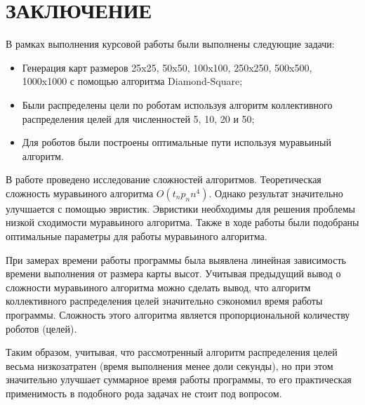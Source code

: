 \documentclass{article}
\numberwithin{equation}{section}
\begin{document}
    \newpage
	\section*{ЗАКЛЮЧЕНИЕ}

	В рамках выполнения курсовой работы были выполнены следующие задачи:
	\begin{itemize}
		\item Генерация карт размеров 25x25, 50x50, 100x100, 250x250, 500x500, 1000x1000 с помощью алгоритма Diamond-Square;
		\item Были распределены цели по роботам используя алгоритм коллективного распределения целей для численностей 5, 10, 20 и 50;
		\item Для роботов были построены оптимальные пути используя муравьиный алгоритм.
	\end{itemize}

	В работе проведено исследование сложностей алгоритмов. Теоретическая сложность муравьиного алгоритма $O(t_{n} p_{n} n^{4})$. Однако результат значительно улучшается с помощью эвристик. Эвристики необходимы для решения проблемы низкой сходимости муравьиного алгоритма. Также в ходе работы были подобраны оптимальные параметры для работы муравьиного алгоритма.

	При замерах времени работы программы была выявлена линейная зависимость времени выполнения от размера карты высот. Учитывая предыдущий вывод о сложности муравьиного алгоритма можно сделать вывод, что алгоритм коллективного распределения целей значительно сэкономил время работы программы. Сложность
	этого алгоритма является пропорциональной количеству роботов (целей).

	Таким образом, учитывая, что рассмотренный алгоритм распределения целей весьма низкозатратен (время выполнения менее доли секунды), но при этом значительно улучшает суммарное время работы программы, то его практическая применимость в подобного рода задачах не стоит под вопросом.
\end{document}
